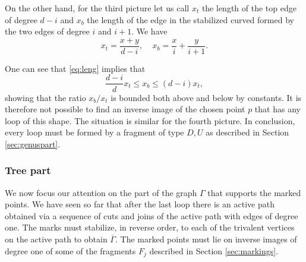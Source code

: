 \documentclass[11pt,reqno]{amsart}
\theoremstyle{definition}
\begin{document}
On the other hand, for the third picture let us call $x_t$ the length of the top edge of degree $d-i$ and $x_b$ the length of the edge in the stabilized curved formed by the two edges of degree $i$ and $i+1$. We have
\begin{equation}
\label{eq:leng}    
x_t = \frac{x+y}{d-i}, \ \ \ \ \ x_b = \frac{x}{i}+ \frac{y}{i+1}.
\end{equation}

One can see that \eqref{eq:leng} implies that
\[
\frac{d-i}{d}x_t\leq x_b\leq (d-i) x_t,
\]
showing that the ratio $x_b/x_t$ is bounded both above and below by constants. It is therefore not possible to find an inverse image of the chosen point $p$ that has any loop of this shape. The situation is similar for the fourth picture. In conclusion, every loop must be formed by a fragment of type $D, U$ as described in Section \ref{sec:genuspart}.




\subsubsection*{Tree part}
We now focus our attention on the part of the graph $\Gamma$ that supports the marked points. We have seen so far that after the last loop there is an active path obtained via a sequence of cuts and joins of the active path with edges of degree one. The marks must stabilize, in reverse order,  to each of the trivalent vertices on the active path to obtain $\overline{\Gamma}$. The marked points must lie on inverse images of degree one of some of the fragments $F_j$ described in Section \ref{sec:markings}.
\end{document}
